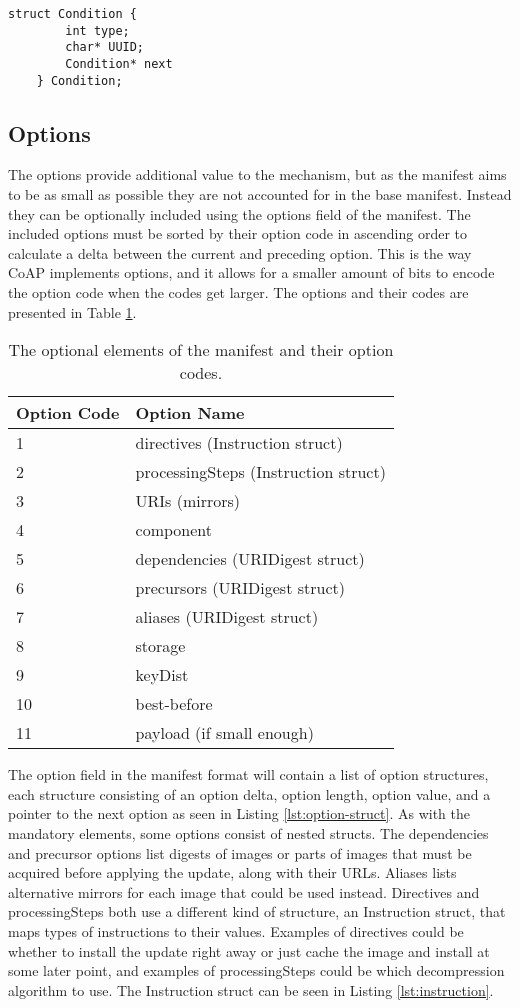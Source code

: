 \documentclass[0-thesis.tex]{subfiles}
\begin{document}
\begin{lstlisting}[caption={The format of vendor, class, and device ID conditions.}, 
                    label={lst:condition-struct}]
    struct Condition {
        int type;
        char* UUID;
        Condition* next
    } Condition;
\end{lstlisting}

\subsection{Options}
\label{ssec:options}
The options provide additional value to the mechanism, but as the manifest aims to be as
small as possible they are not accounted for in the base manifest. Instead they can be
optionally included using the options field of the manifest. The included options must be
sorted by their option code in ascending order to calculate a delta between the current
and preceding option. This is the way CoAP implements options, and it allows for a
smaller amount of bits to encode the option code when the codes get larger. The options
and their codes are presented in Table \ref{tab:option-codes}.

\begin{longtable}[]{@{}ll@{}}
    \caption{The optional elements of the manifest and their option codes.}
    \label{tab:option-codes}\\
    \toprule
    Option Code & Option Name\tabularnewline
    \midrule
    \endhead
    1 & directives (Instruction struct)\tabularnewline
    2 & processingSteps (Instruction struct)\tabularnewline
    3 & URIs (mirrors)\tabularnewline
    4 & component\tabularnewline
    5 & dependencies (URIDigest struct)\tabularnewline
    6 & precursors (URIDigest struct)\tabularnewline
    7 & aliases (URIDigest struct)\tabularnewline
    8 & storage\tabularnewline
    9 & keyDist\tabularnewline
    10 & best-before\tabularnewline
    11 & payload (if small enough)\tabularnewline
    \bottomrule
\end{longtable}
    

The option field in the manifest format will contain a list of option structures, each
structure consisting of an option delta, option length, option value, and a pointer to the
next option as seen in Listing \ref{lst:option-struct}. As with the mandatory elements,
some options consist of nested structs. The dependencies and precursor options list
digests of images or parts of images that must be acquired before applying the update,
along with their URLs. Aliases lists alternative mirrors for each image that could be used
instead. Directives and processingSteps both use a different kind of structure, an
Instruction struct, that maps types of instructions to their values. Examples of
directives could be whether to install the update right away or just cache the image and
install at some later point, and examples of processingSteps could be which decompression
algorithm to use. The Instruction struct can be seen in Listing \ref{lst:instruction}.
\end{document}
